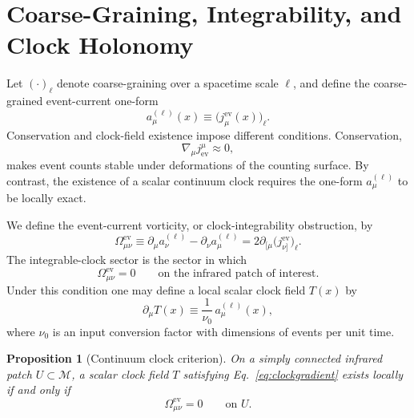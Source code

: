 \documentclass[pdflatex,sn-mathphys-num]{sn-jnl}
\theoremstyle{thmstylethree}
\theoremstyle{thmstyleone}
\newtheorem{proposition}{Proposition}[section]
\theoremstyle{thmstyletwo}
\numberwithin{equation}{section}
\begin{document}
    \section{Coarse-Graining, Integrability, and Clock Holonomy}
    \label{sec:clocklimit}
    
    Let $(\cdot)_\ell$ denote coarse-graining over a spacetime scale $\ell$, and define the coarse-grained event-current one-form
    \begin{equation}
        a^{(\ell)}_\mu(x) \equiv \big(j^{\mathrm{ev}}_\mu(x)\big)_\ell .
        \label{eq:clockoneform}
    \end{equation}
    Conservation and clock-field existence impose different conditions. Conservation,
    \begin{equation}
        \nabla_\mu j^\mu_{\mathrm{ev}}\approx 0,
    \end{equation}
    makes event counts stable under deformations of the counting surface. By contrast, the existence of a scalar continuum clock requires the one-form $a^{(\ell)}_\mu$ to be locally exact.
    
    We define the event-current vorticity, or clock-integrability obstruction, by
    \begin{equation}
        \Omega^{\mathrm{ev}}_{\mu\nu}
        \equiv
        \partial_\mu a^{(\ell)}_\nu
        -
        \partial_\nu a^{(\ell)}_\mu
        =
        2\partial_{[\mu}\big(j^{\mathrm{ev}}_{\nu]}\big)_\ell .
        \label{eq:eventvorticity}
    \end{equation}
    The integrable-clock sector is the sector in which
    \begin{equation}
        \Omega^{\mathrm{ev}}_{\mu\nu}=0
        \qquad\text{on the infrared patch of interest.}
        \label{eq:integrability}
    \end{equation}
    Under this condition one may define a local scalar clock field $T(x)$ by
    \begin{equation}
        \partial_\mu T(x) \equiv \frac{1}{\nu_0}\,a^{(\ell)}_\mu(x),
        \label{eq:clockgradient}
    \end{equation}
    where $\nu_0$ is an input conversion factor with dimensions of events per unit time.
    
    \begin{proposition}[Continuum clock criterion]
        On a simply connected infrared patch $U\subset\mathcal{M}$, a scalar clock field $T$ satisfying Eq.~\eqref{eq:clockgradient} exists locally if and only if
        \begin{equation}
            \Omega^{\mathrm{ev}}_{\mu\nu}=0
            \qquad \text{on } U .
        \end{equation}
    \end{proposition}
    
\end{document}
